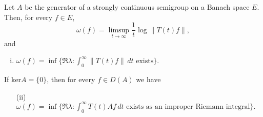 \bigskip
\noindent
\begin{theorem}\label{thm:a4-1.3}
Let $A$ be the generator of a strongly continuous semigroup on a Banach space $E$. 
Then, for every $f \in E$,
\begin{equation}\label{eq:a4-1.2}
\omega(f) = \limsup_{t \to \infty} \frac{1}{t}\log\|T(t)f\|,
\end{equation}
and
\begin{enumerate}[(i)]
\item $\omega(f) = \inf\{\Re \lambda : \int_{0}^{\infty} \|T(t)f\| \, dt \text{ exists}\}.$
\end{enumerate}
If $\text{ker} A = \{0\}$, then for every $f \in D(A)$ we have 
\begin{enumerate}
\item[(ii)] $\omega(f) = \inf\{\Re\lambda : \int_{0}^{\infty} T(t)Af \, dt \text{ exists as an improper Riemann integral}\}.$
\end{enumerate}
\end{theorem}
